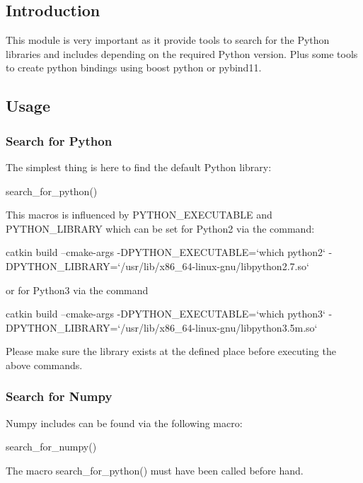 \subsection*{Introduction}

This module is very important as it provide tools to search for the Python libraries and includes depending on the required Python version. Plus some tools to create python bindings using boost python or pybind11.

\subsection*{Usage}

\subsubsection*{Search for Python}

The simplest thing is here to find the default Python library\+: \begin{DoxyVerb}search_for_python()
\end{DoxyVerb}


This macros is influenced by {\ttfamily P\+Y\+T\+H\+O\+N\+\_\+\+E\+X\+E\+C\+U\+T\+A\+B\+LE} and {\ttfamily P\+Y\+T\+H\+O\+N\+\_\+\+L\+I\+B\+R\+A\+RY} which can be set for Python2 via the command\+: \begin{DoxyVerb}catkin build --cmake-args -DPYTHON_EXECUTABLE=`which python2` -DPYTHON_LIBRARY=`/usr/lib/x86_64-linux-gnu/libpython2.7.so`
\end{DoxyVerb}


or for Python3 via the command \begin{DoxyVerb}catkin build --cmake-args -DPYTHON_EXECUTABLE=`which python3` -DPYTHON_LIBRARY=`/usr/lib/x86_64-linux-gnu/libpython3.5m.so`
\end{DoxyVerb}


Please make sure the library exists at the defined place before executing the above commands.

\subsubsection*{Search for Numpy}

Numpy includes can be found via the following macro\+: \begin{DoxyVerb}search_for_numpy()
\end{DoxyVerb}


The macro {\ttfamily search\+\_\+for\+\_\+python()} must have been called before hand. 
